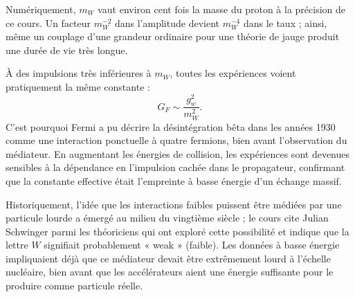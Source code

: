 Numériquement, \(m_W\) vaut environ cent fois la masse du proton à la précision de ce cours. Un facteur \(m_W^{-2}\) dans l’amplitude devient \(m_W^{-4}\) dans le taux ; ainsi, même un couplage d’une grandeur ordinaire pour une théorie de jauge produit une durée de vie très longue.

\begin{classroomqa}
\end{classroomqa}

À des impulsions très inférieures à \(m_W\), toutes les expériences voient pratiquement la même constante :
\begin{equation}
  G_F\sim\frac{g_w^2}{m_W^2}.
\end{equation}
C’est pourquoi Fermi a pu décrire la désintégration bêta dans les années 1930 comme une interaction ponctuelle à quatre fermions, bien avant l’observation du médiateur. En augmentant les énergies de collision, les expériences sont devenues sensibles à la dépendance en l’impulsion cachée dans le propagateur, confirmant que la constante effective était l’empreinte à basse énergie d’un échange massif.

Historiquement, l’idée que les interactions faibles puissent être médiées par une particule lourde a émergé au milieu du vingtième siècle ; le cours cite Julian Schwinger parmi les théoriciens qui ont exploré cette possibilité et indique que la lettre \(W\) signifiait probablement « weak » (faible). Les données à basse énergie impliquaient déjà que ce médiateur devait être extrêmement lourd à l’échelle nucléaire, bien avant que les accélérateurs aient une énergie suffisante pour le produire comme particule réelle.

